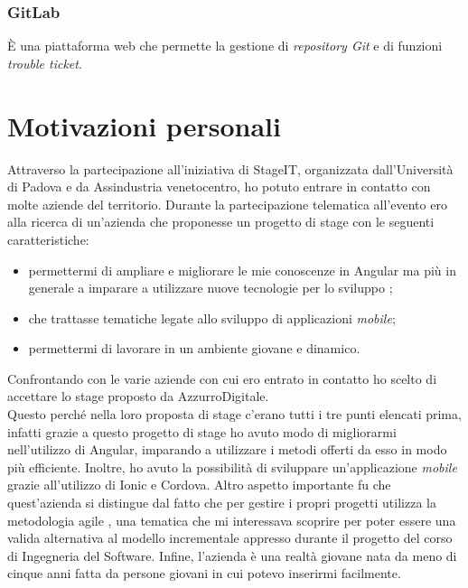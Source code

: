 \subsubsection{GitLab}
È una piattaforma web  che permette la gestione di \emph{repository Git} e di funzioni \emph{trouble ticket}.

\section{Motivazioni personali}
Attraverso la partecipazione all'iniziativa di StageIT, organizzata dall'Università di Padova e da Assindustria venetocentro, ho potuto entrare in contatto con molte aziende del territorio.
Durante la partecipazione telematica all'evento ero alla ricerca di un’azienda che proponesse un progetto di stage con le seguenti caratteristiche:

\begin{itemize}
	\item permettermi di ampliare e migliorare le mie conoscenze in Angular ma più in generale a imparare a utilizzare nuove tecnologie per lo sviluppo ;
	\item che trattasse tematiche legate allo sviluppo di applicazioni \emph{mobile};
	\item permettermi di lavorare in un ambiente giovane e dinamico.
	
\end{itemize}  

Confrontando con le varie aziende con cui ero entrato in contatto ho scelto di accettare lo stage proposto da AzzurroDigitale. \\

Questo perché nella loro proposta di stage c'erano tutti i tre punti elencati prima, infatti grazie a questo progetto di stage ho avuto modo di migliorarmi nell’utilizzo di Angular, imparando a utilizzare i metodi offerti da esso in modo più efficiente. Inoltre, ho avuto la possibilità di sviluppare un’applicazione \emph{mobile} grazie all'utilizzo di Ionic e Cordova. Altro aspetto importante fu che quest'azienda si distingue dal fatto che per gestire i propri progetti utilizza la metodologia agile , una tematica che mi interessava scoprire per poter essere una valida alternativa al modello incrementale appresso durante il progetto del corso di Ingegneria del Software. Infine, l'azienda è una realtà giovane nata da meno di cinque anni fatta da persone giovani in cui potevo inserirmi facilmente.
